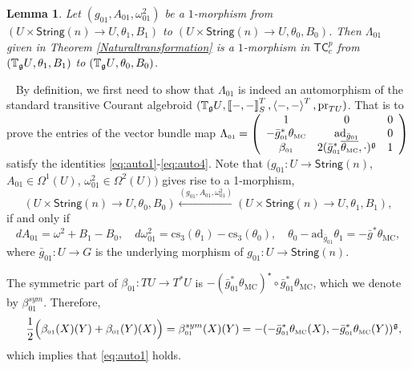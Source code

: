 \documentclass[letterpaper,10pt, oneside]{article} %
\newtheorem{lem}[thm]{Lemma}\newtheorem{lemma}[thm]{Lemma}
\newcommand{\tcalgdp}{{\mathsf{TC}^{p}_{c}}} %
\newcommand{\String}{\mathsf{String}}%
\newcommand{\tagu}{{\mathbb{T}_\g U}}
\newcommand{\pf}{\noindent{\bf Proof.}\ }
\newcommand{\cs}{\mathrm{cs}}
\newcommand{\TM}{\theta_{\scriptscriptstyle \mathrm{MC}}}
\newcommand{\half}{\frac{1}{2}}
\newcommand{\pair}[1]{\left\langle #1\right\rangle}
\newcommand{\Courant}[1]{\left\llbracket  #1\right\rrbracket }
\newcommand{\ad}{\mathrm{ad}}
\newcommand{\pr}{\mathrm{pr}}
\newcommand{\bg}{\bar{g}}
\begin{document}
\begin{lem}\label{1morphism}  Let $(g_{\scriptscriptstyle 01}, A_{\scriptscriptstyle 01}, \omega^2_{\scriptscriptstyle 01})$ be a $1$-morphism from $(U\times \String(n)\to U, \theta_1, B_1)$ to $(U\times \String(n)\to U, \theta_0, B_0)$.
Then $\Lambda_{\scriptscriptstyle 01}$ given in Theorem \ref{Naturaltransformation} is a $1$-morphism in $\tcalgdp$ from $(\tagu,  \theta_1, B_1)$ to $ (\tagu, \theta_0, B_0)$.
\end{lem}
\pf
By definition, we first need to show that $\Lambda_{\scriptscriptstyle 01}$ is indeed an automorphism of
the standard transitive Courant algebroid $(\tagu, \Courant{-,-}^T_S,  \pair{-,-}^T,\pr_{TU})$. That is to prove the entries of the vector bundle map $\Lambda_{\scriptscriptstyle 01}=\left(\begin{array}{ccc}
1&0&0\\
-\bar{g}_{\scriptscriptstyle 01}^*\TM&\ad_{\bar{g}_{\scriptscriptstyle 01}}&0\\
\beta_{\scriptscriptstyle 01}&2(\bar{g}_{\scriptscriptstyle 01}^*\overline{\TM},\cdot)^\g&1
\end{array}\right)$  satisfy the identities \eqref{eq:auto1}-\eqref{eq:auto4}. Note that $(g_{\scriptscriptstyle 01}: U \to \String(n)$, $A_{\scriptscriptstyle 01}\in \Omega^1(U)$, $\omega^2_{\scriptscriptstyle 01}
  \in \Omega^2(U))$ gives rise to a 1-morphism,
\[(U\times \String(n)\to U, \theta_0, B_0) \xleftarrow {(g_{\scriptscriptstyle 01}, A_{\scriptscriptstyle 01},
  \omega^2_{\scriptscriptstyle 01})} (U\times\String(n)\to U, \theta_1,  B_1),\] if and only if
\begin{equation}\label{eq:diffcs}
dA_{\scriptscriptstyle 01} = \omega^2 +B_1-B_0, \quad d\omega^2_{\scriptscriptstyle 01} =
\cs_3(\theta_1)-\cs_3(\theta_0), \quad \theta_0-\ad_{\bar{g}_{\scriptscriptstyle 01}}
\theta_1 = - \bg^* \TM,
\end{equation}
where $\bar{g}_{\scriptscriptstyle 01}:U\rightarrow G$ is the underlying morphism of $g_{\scriptscriptstyle 01}:U\rightarrow \String(n)$.

The symmetric part of $\beta_{\scriptscriptstyle 01}:TU\longrightarrow T^*U$ is $-(\bar{g}_{\scriptscriptstyle 01}^*\TM)^\star \circ \bar{g}_{\scriptscriptstyle 01}^*\TM$, which we denote by $\beta_{\scriptscriptstyle 01}^{sym}$. Therefore,
\begin{eqnarray*}
&& \half\Big( \beta_{\scriptscriptstyle 01}(X)(Y)+\beta_{\scriptscriptstyle 01}(Y)(X)\Big)=\beta^{sym}_{\scriptscriptstyle 01}(X)(Y)=-(-\bar{g}_{\scriptscriptstyle 01}^*\TM(X),-\bar{g}_{\scriptscriptstyle 01}^*\TM(Y))^\g,
\end{eqnarray*}
which implies that \eqref{eq:auto1} holds.
\end{document}
